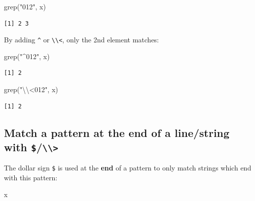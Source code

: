 \documentclass[
]{book}
\newenvironment{Shaded}{\begin{snugshade}}{\end{snugshade}}
\newcommand{\FunctionTok}[1]{\textcolor[rgb]{0.00,0.00,0.00}{#1}}
\newcommand{\NormalTok}[1]{#1}
\newcommand{\SpecialCharTok}[1]{\textcolor[rgb]{0.00,0.00,0.00}{#1}}
\newcommand{\StringTok}[1]{\textcolor[rgb]{0.31,0.60,0.02}{#1}}
\begin{document}
\begin{Shaded}
\begin{Highlighting}[]
\FunctionTok{grep}\NormalTok{(}\StringTok{"012"}\NormalTok{, x)}
\end{Highlighting}
\end{Shaded}

\begin{verbatim}
[1] 2 3
\end{verbatim}

By adding \texttt{\^{}} or \texttt{\textbackslash{}\textbackslash{}\textless{}}, only the 2nd element matches:

\begin{Shaded}
\begin{Highlighting}[]
\FunctionTok{grep}\NormalTok{(}\StringTok{"\^{}012"}\NormalTok{, x)}
\end{Highlighting}
\end{Shaded}

\begin{verbatim}
[1] 2
\end{verbatim}

\begin{Shaded}
\begin{Highlighting}[]
\FunctionTok{grep}\NormalTok{(}\StringTok{"}\SpecialCharTok{\textbackslash{}\textbackslash{}}\StringTok{\textless{}012"}\NormalTok{, x)}
\end{Highlighting}
\end{Shaded}

\begin{verbatim}
[1] 2
\end{verbatim}

\hypertarget{match-a-pattern-at-the-end-of-a-linestring-with}{%
\subsection{\texorpdfstring{Match a pattern at the end of a line/string with \texttt{\$}/\texttt{\textbackslash{}\textbackslash{}\textgreater{}}}{Match a pattern at the end of a line/string with \$/\textbackslash\textbackslash\textgreater{}}}\label{match-a-pattern-at-the-end-of-a-linestring-with}}

The dollar sign \texttt{\$} is used at the \textbf{end} of a pattern to only match strings which end with this pattern:

\begin{Shaded}
\begin{Highlighting}[]
\NormalTok{x}
\end{Highlighting}
\end{Shaded}
\end{document}
